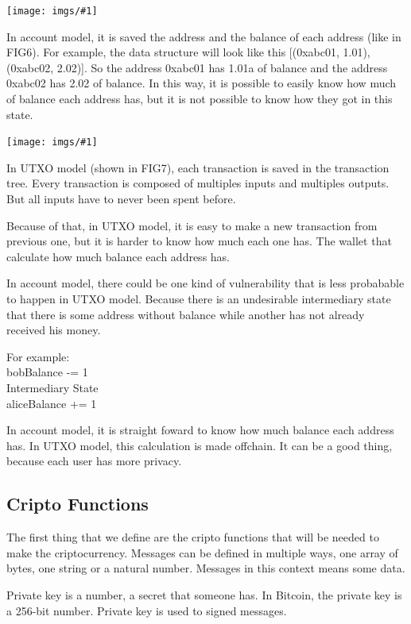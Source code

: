 \documentclass[12pt]{article}
\newcommand{\incimg}[1]{\texttt{[image: imgs/\#1]}}
\begin{document}
  \incimg{account.jpeg}

In account model, it is saved the address and the balance of each address
(like in FIG6).
For example, the data structure will look like this [(0xabc01, 1.01), (0xabc02, 2.02)].
So the address 0xabc01 has 1.01a of balance and the address 0xabc02 has 2.02 of balance.
In this way, it is possible to easily know how much of balance each address has,
but it is not possible to know how they got in this state.

  \incimg{utxo.png}

In UTXO model (shown in FIG7), each transaction is saved in the transaction tree.
Every transaction is composed of multiples inputs and multiples outputs.
But all inputs have to never been spent before.

Because of that, in UTXO model, it is easy to make a new transaction from previous one, but it is harder
to know how much each one has.
The wallet that calculate how much balance each address has.

In account model, there could be one kind of vulnerability that is less probabable to happen in UTXO
model.
Because there is an undesirable intermediary state that there is some address without balance while
another has not already received his money.

For example: \\
bobBalance -= 1 \\
Intermediary State \\
aliceBalance += 1

In account model, it is straight foward to know how much balance each address has.
In UTXO model, this calculation is made offchain. It can be a good thing,
because each user has more privacy.

\subsection{Cripto Functions}
The first thing that we define are the cripto functions that will be needed to make the criptocurrency.
Messages can be defined in multiple ways, one array of bytes, one string or a natural number.
Messages in this context means some data.

Private key is a number, a secret that someone has.
In Bitcoin, the private key is a 256-bit number.
Private key is used to signed messages.
\end{document}
